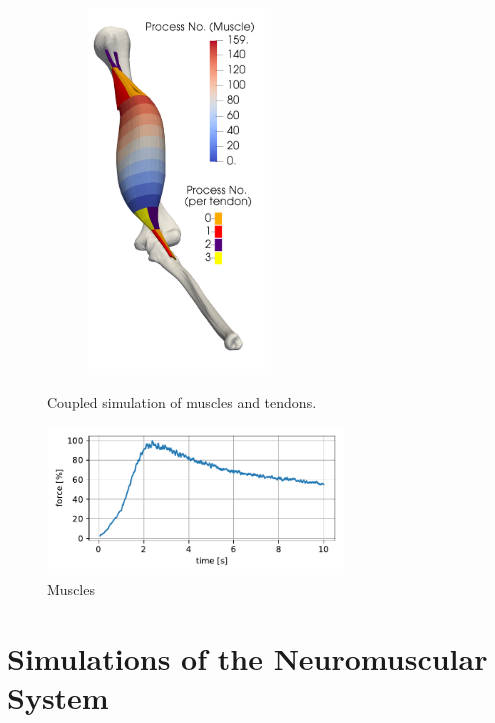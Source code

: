 \begin{figure}
\begin{subfigure}[t]{0.28\textwidth}
    \includegraphics[height=97mm]{images/results/application/precice_activated_muscles3.png}%
    \caption{}%
    \label{fig:precice_activated_muscles_3}%
  \end{subfigure}
  \caption{Coupled simulation of muscles and tendons.}%
  \label{fig:precice_muscle_force}%
\end{figure}%

\begin{figure}[H]
  \centering%
  \includegraphics[width=0.7\textwidth]{images/results/application/precice_muscle_force.pdf}%
  \caption{Muscles}%
  \label{fig:precice_muscle_force}%
\end{figure}




\section{Simulations of the Neuromuscular System}

